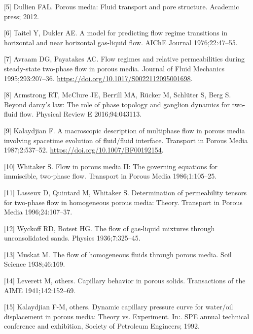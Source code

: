 \documentclass[]{article}
\begin{document}
\leavevmode\hypertarget{ref-dullien2012porous}{}%
{[}5{]} Dullien FAL. Porous media: Fluid transport and pore structure.
Academic press; 2012.

\leavevmode\hypertarget{ref-taitel1976model}{}%
{[}6{]} Taitel Y, Dukler AE. A model for predicting flow regime
transitions in horizontal and near horizontal gas-liquid flow. AIChE
Journal 1976;22:47--55.

\leavevmode\hypertarget{ref-Avraam1995a}{}%
{[}7{]} Avraam DG, Payatakes AC. Flow regimes and relative
permeabilities during steady-state two-phase flow in porous media.
Journal of Fluid Mechanics 1995;293:207--36.
\url{https://doi.org/10.1017/S0022112095001698}.

\leavevmode\hypertarget{ref-armstrong2016beyond}{}%
{[}8{]} Armstrong RT, McClure JE, Berrill MA, Rücker M, Schlüter S, Berg
S. Beyond darcy's law: The role of phase topology and ganglion dynamics
for two-fluid flow. Physical Review E 2016;94:043113.

\leavevmode\hypertarget{ref-Kalaydjian1987}{}%
{[}9{]} Kalaydjian F. A macroscopic description of multiphase flow in
porous media involving spacetime evolution of fluid/fluid interface.
Transport in Porous Media 1987;2:537--52.
\url{https://doi.org/10.1007/BF00192154}.

\leavevmode\hypertarget{ref-Whitaker1986a}{}%
{[}10{]} Whitaker S. Flow in porous media II: The governing equations
for immiscible, two-phase flow. Transport in Porous Media
1986;1:105--25.

\leavevmode\hypertarget{ref-Lasseux1996}{}%
{[}11{]} Lasseux D, Quintard M, Whitaker S. Determination of
permeability tensors for two-phase flow in homogeneous porous media:
Theory. Transport in Porous Media 1996;24:107--37.

\leavevmode\hypertarget{ref-wyckoff1936flow}{}%
{[}12{]} Wyckoff RD, Botset HG. The flow of gas-liquid mixtures through
unconsolidated sands. Physics 1936;7:325--45.

\leavevmode\hypertarget{ref-muskat1938flow}{}%
{[}13{]} Muskat M. The flow of homogeneous fluids through porous media.
Soil Science 1938;46:169.

\leavevmode\hypertarget{ref-leverett1941capillary}{}%
{[}14{]} Leverett M, others. Capillary behavior in porous solids.
Transactions of the AIME 1941;142:152--69.

\leavevmode\hypertarget{ref-kalaydjian1992dynamic}{}%
{[}15{]} Kalaydjian F-M, others. Dynamic capillary pressure curve for
water/oil displacement in porous media: Theory vs. Experiment. In:. SPE
annual technical conference and exhibition, Society of Petroleum
Engineers; 1992.
\end{document}
